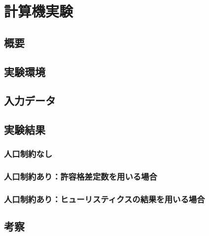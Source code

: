 \chapter{計算機実験} \label{chapter:5}

\section{概要}

\section{実験環境}

\section{入力データ}

\section{実験結果}

\subsection{人口制約なし}

\subsection{人口制約あり：許容格差定数を用いる場合}

\subsection{人口制約あり：ヒューリスティクスの結果を用いる場合}

\section{考察}